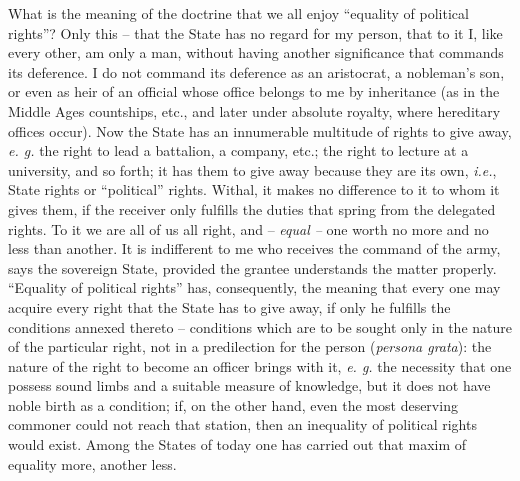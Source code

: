 \documentclass[12pt,a4paper]{book}
\begin{document}
What is the meaning of the doctrine that we all enjoy ``equality of political 
rights''? Only this -- that the State has no regard for my person, that to it 
I, like every other, am only a man, without having another significance that 
commands its deference. I do not command its deference as an aristocrat, a 
nobleman's son, or even as heir of an official whose office belongs to me by 
inheritance (as in the Middle Ages countships, etc., and later under absolute 
royalty, where hereditary offices occur). Now the State has an innumerable 
multitude of rights to give away, \textit{e. g.} the right to lead a 
battalion, a company, etc.; the right to lecture at a university, and so 
forth; it has them to give away because they are its own, \textit{i.e.}, State 
rights or ``political'' rights. Withal, it makes no difference to it to whom 
it gives them, if the receiver only fulfills the duties that spring from the 
delegated rights. To it we are all of us all right, and -- \textit{equal --} 
one worth no more and no less than another. It is indifferent to me who 
receives the command of the army, says the sovereign State, provided the 
grantee understands the matter properly. ``Equality of political rights'' 
has, consequently, the meaning that every one may acquire every right that the 
State has to give away, if only he fulfills the conditions annexed thereto -- 
conditions which are to be sought only in the nature of the particular right, 
not in a predilection for the person (\textit{persona grata}): the nature of 
the right to become an officer brings with it, \textit{e. g.} the necessity 
that one possess sound limbs and a suitable measure of knowledge, but it does 
not have noble birth as a condition; if, on the other hand, even the most 
deserving commoner could not reach that station, then an inequality of 
political rights would exist. Among the States of today one has carried out 
that maxim of equality more, another less.
\end{document}
